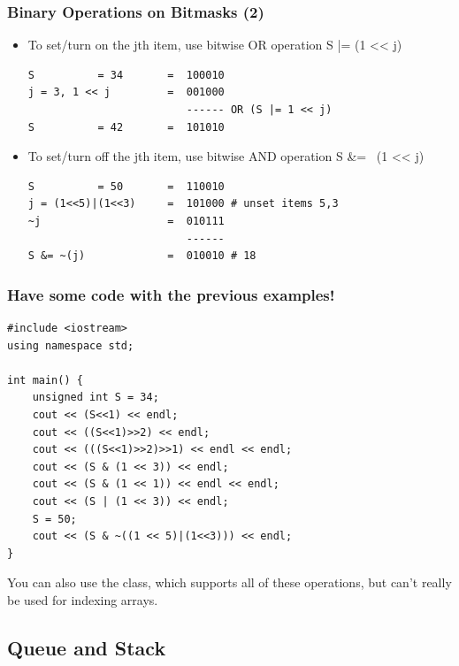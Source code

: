\documentclass{beamer}
\begin{document}
\begin{frame}[fragile]
  \frametitle{Binary Operations on Bitmasks (2)}
  {\smaller
  \begin{itemize}
  \item To set/turn on the jth item, use bitwise OR operation S |= (1 << j)
\begin{verbatim}
S          = 34       =  100010
j = 3, 1 << j         =  001000
                         ------ OR (S |= 1 << j)
S          = 42       =  101010
\end{verbatim}
\item To set/turn off the jth item, use bitwise AND operation S \&= ~(1 << j)
\begin{verbatim}
S          = 50       =  110010
j = (1<<5)|(1<<3)     =  101000 # unset items 5,3 
~j                    =  010111
                         ------
S &= ~(j)             =  010010 # 18
\end{verbatim}
  \end{itemize}

  }
\end{frame}

\begin{frame}[fragile]
  \frametitle{Have some code with the previous examples!}
  {\smaller
\begin{verbatim}
#include <iostream>
using namespace std;

int main() {
    unsigned int S = 34;    
    cout << (S<<1) << endl;
    cout << ((S<<1)>>2) << endl;
    cout << (((S<<1)>>2)>>1) << endl << endl;    
    cout << (S & (1 << 3)) << endl;
    cout << (S & (1 << 1)) << endl << endl;    
    cout << (S | (1 << 3)) << endl;    
    S = 50;
    cout << (S & ~((1 << 5)|(1<<3))) << endl;
}
\end{verbatim}

\begin{block}{}
  You can also use the  class, which supports all of these
  operations, but can't really be used for indexing arrays.
\end{block}

  }
\end{frame}

\subsection{Queue and Stack}

\end{document}
